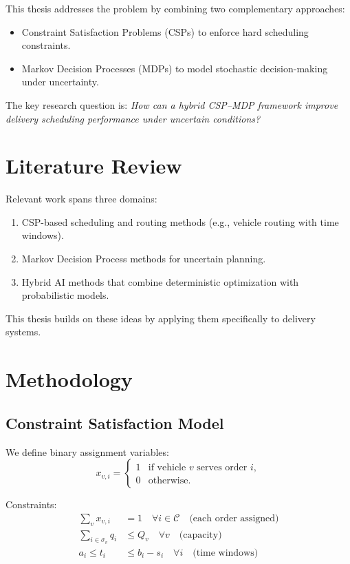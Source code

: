 \documentclass[a4paper,12pt]{report}
\begin{document}
This thesis addresses the problem by combining two complementary approaches:
\begin{itemize}
    \item Constraint Satisfaction Problems (CSPs) to enforce hard scheduling constraints.
    \item Markov Decision Processes (MDPs) to model stochastic decision-making under uncertainty.
\end{itemize}

The key research question is: \emph{How can a hybrid CSP--MDP framework improve 
delivery scheduling performance under uncertain conditions?}

\chapter{Literature Review}
Relevant work spans three domains: 
\begin{enumerate}
    \item CSP-based scheduling and routing methods (e.g., vehicle routing with time windows).
    \item Markov Decision Process methods for uncertain planning.
    \item Hybrid AI methods that combine deterministic optimization with probabilistic models.
\end{enumerate}

This thesis builds on these ideas by applying them specifically to delivery systems.

\chapter{Methodology}

\section{Constraint Satisfaction Model}
We define binary assignment variables:
\[
x_{v,i} =
\begin{cases}
1 & \text{if vehicle $v$ serves order $i$}, \\
0 & \text{otherwise.}
\end{cases}
\]

Constraints:
\begin{align}
\sum_{v} x_{v,i} &= 1 \quad \forall i \in \mathcal{C} \quad \text{(each order assigned)} \\
\sum_{i \in \sigma_v} q_i &\le Q_v \quad \forall v \quad \text{(capacity)} \\
a_i \le t_i &\le b_i - s_i \quad \forall i \quad \text{(time windows)}
\end{align}
\end{document}
